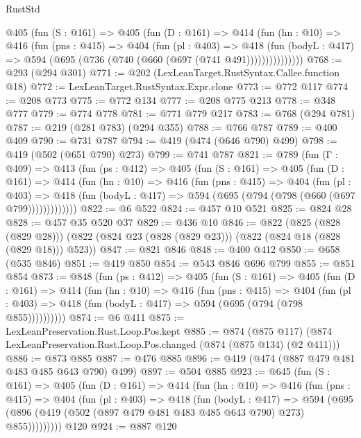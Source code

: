\begin{lexlean}{RustStd}
\begin{coremodule}
        @405
          (fun (S : @161) =>
          @405
            (fun (D : @161) =>
            @414
              (fun (hn : @10) =>
              @416
                (fun (pns : @415) =>
                @404
                  (fun (pl : @403) =>
                  @418
                    (fun (bodyL : @417) =>
                    @594 (@695 (@736 (@740 (@660 (@697 (@741 @491)))))))))))))))
@768 := @293 (@294 @301)
@771 := @202 (LexLeanTarget.RustSyntax.Callee.function @18)
@772 := LexLeanTarget.RustSyntax.Expr.clone
@773 := @772 @117
@774 := @208 @773
@775 := @772 @134
@777 := @208 @775 @213
@778 := @348 @777
@779 := @774 @778
@781 := @771 @779 @217
@783 := @768 (@294 @781)
@787 := @219 (@281 @783) (@294 @355)
@788 := @766 @787
@789 := @400 @409
@790 := @731 @787
@794 := @419 (@474 (@646 @790) @499)
@798 := @419 (@502 (@651 @790) @273)
@799 := @741 @787
@821 := @789
    (fun (Γ : @409) =>
    @413
      (fun (ps : @412) =>
      @405
        (fun (S : @161) =>
        @405
          (fun (D : @161) =>
          @414
            (fun (hn : @10) =>
            @416
              (fun (pns : @415) =>
              @404
                (fun (pl : @403) =>
                @418 (fun (bodyL : @417) => @594 (@695 (@794 (@798 (@660 (@697 @799)))))))))))))
@822 := @6 @522
@824 := @457 @10 @521
@825 := @824 @28
@828 := @457 @35 @520 @37
@829 := @436 @10
@846 := @822
    (@825 (@828 (@829 @28)))
    (@822 (@824 @23 (@828 (@829 @23))) (@822 (@824 @18 (@828 (@829 @18))) @523))
@847 := @821 @846
@848 := @400 @412
@850 := @658 (@535 @846)
@851 := @419 @850
@854 := @543 @846 @696 @799
@855 := @851 @854
@873 := @848
    (fun (ps : @412) =>
    @405
      (fun (S : @161) =>
      @405
        (fun (D : @161) =>
        @414
          (fun (hn : @10) =>
          @416
            (fun (pns : @415) =>
            @404
              (fun (pl : @403) => @418 (fun (bodyL : @417) => @594 (@695 (@794 (@798 @855))))))))))
@874 := @6 @411
@875 := LexLeanPreservation.Rust.Loop.Pos.kept
@885 := @874
    (@875 @117)
    (@874 LexLeanPreservation.Rust.Loop.Pos.changed (@874 (@875 @134) (@2 @411)))
@886 := @873 @885
@887 := @476 @885
@896 := @419 (@474 (@887 @479 @481 @483 @485 @643 @790) @499)
@897 := @504 @885
@923 := @645
    (fun (S : @161) =>
    @405
      (fun (D : @161) =>
      @414
        (fun (hn : @10) =>
        @416
          (fun (pns : @415) =>
          @404
            (fun (pl : @403) =>
            @418
              (fun (bodyL : @417) =>
              @594 (@695 (@896 (@419 (@502 (@897 @479 @481 @483 @485 @643 @790) @273) @855)))))))))
    @120
@924 := @887 @120

\end{coremodule}
\end{lexlean}
